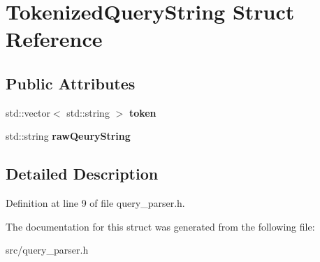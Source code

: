 \hypertarget{struct_tokenized_query_string}{}\section{Tokenized\+Query\+String Struct Reference}
\label{struct_tokenized_query_string}
\subsection*{Public Attributes}
\begin{DoxyCompactItemize}
\item 
\mbox{\label{struct_tokenized_query_string_a10a43878cafe9aa3f090f441d7002d51}} 
std\+::vector$<$ std\+::string $>$ {\bfseries token}
\item 
\mbox{\label{struct_tokenized_query_string_affb87c2803b6295bb13b83395438609a}} 
std\+::string {\bfseries raw\+Qeury\+String}
\end{DoxyCompactItemize}


\subsection{Detailed Description}


Definition at line 9 of file query\+\_\+parser.\+h.



The documentation for this struct was generated from the following file\+:\begin{DoxyCompactItemize}
\item 
src/query\+\_\+parser.\+h\end{DoxyCompactItemize}
